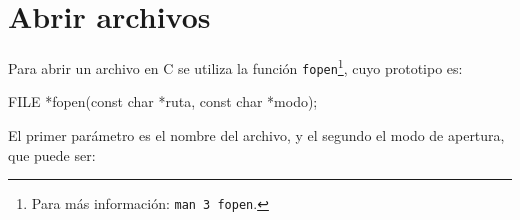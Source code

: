%
%
%
%
%
%


\section{Abrir archivos}

Para abrir un archivo en C se utiliza la función
\lstinline!fopen!\footnote{Para más información: \texttt{man 3 fopen}.}, cuyo
prototipo es:

\begin{codigo-c-plano}
FILE *fopen(const char *ruta, const char *modo);
\end{codigo-c-plano}

El primer parámetro es el nombre del archivo, y el segundo el modo de
apertura, que puede ser:

